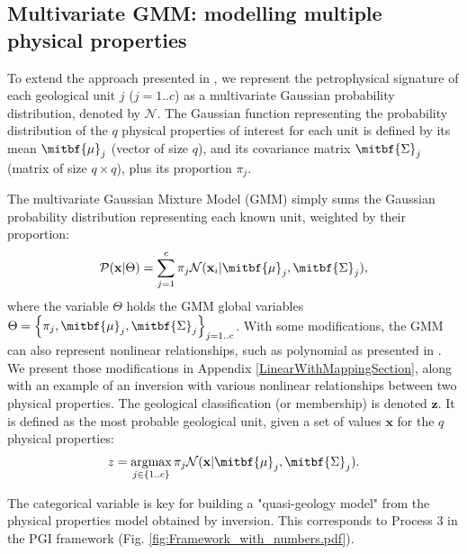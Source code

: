 \documentclass[extra, mreferee]{gji_joint} %
\begin{document}
\subsection{Multivariate GMM: modelling multiple physical properties} \label{PetrophysicsSection}

To extend the approach presented in \citet{ggz389}, we represent the petrophysical signature of each geological unit $j$ ($j=1..c$) as a multivariate Gaussian probability distribution, denoted by $\mathcal{N}$.
The Gaussian function representing the probability distribution of the $q$ physical properties of interest for each unit is defined by its mean $\mitbf{\mu}_j$ (vector of size $q$), and its covariance matrix $\mitbf{\Sigma}_j$ (matrix of size $q\times q$), plus its proportion $\pi_j$.

The multivariate Gaussian Mixture Model (GMM) simply sums the Gaussian probability distribution representing each known unit, weighted by their proportion:
\begin{equation}
\mathcal{P}(\mathbf{x}|\Theta) = \sum_{j=1}^c \pi_j \mathcal{N}(\mathbf{x}_i|\mitbf{\mu}_j, \mitbf{\Sigma}_j) \label{GMM},
\end{equation}
where the variable $\Theta$ holds the GMM global variables $\Theta= \left\{\pi_j, \mitbf{\mu}_j, \mitbf{\Sigma}_j\right\}_{j=1..c}$. With some modifications, the GMM can also represent nonlinear relationships, such as polynomial as presented in \citet{Onizawa2002}. We present those modifications in Appendix \ref{LinearWithMappingSection}, along with an example of an inversion with various nonlinear relationships between two physical properties.
\newpage
The geological classification (or membership) is denoted $\mathbf{z}$. It is defined as the most probable geological unit, given a set of values $\mathbf{x}$ for the $q$ physical properties:
\begin{equation}
z = \mathop{\hbox{argmax}}\limits_{j \in \left\{1..c\right\}} \pi_{j} \mathcal{N}(\mathbf{x}|\mitbf{\mu}_j,\mitbf{\Sigma}_j) \label{eq:MAP_z_physProp}.
\end{equation}

The categorical variable is key for building a "quasi-geology model" \citep{QuasiGeologicalModel} from the physical properties model obtained by inversion. This corresponds to Process $3$ in the PGI framework (Fig. \ref{fig:Framework_with_numbers.pdf}).
\end{document}
